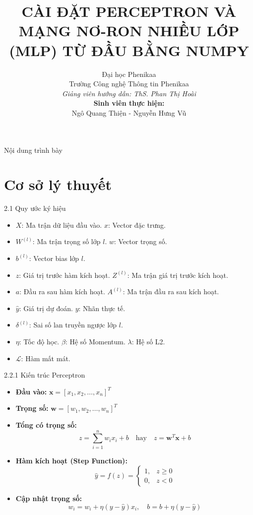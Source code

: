 \documentclass{beamer}
\title[Cài đặt Perceptron \& MLP]{CÀI ĐẶT PERCEPTRON VÀ MẠNG NƠ-RON NHIỀU LỚP (MLP) TỪ ĐẦU BẰNG NUMPY}
\author[Thiện, Vũ]{
  Đại học Phenikaa \\
  Trường Công nghệ Thông tin Phenikaa \\
  \vspace{0.5cm}
  \textit{Giảng viên hướng dẫn: ThS. Phan Thị Hoài} \\
  \vspace{0.2cm}
  \textbf{Sinh viên thực hiện:} \\
  Ngô Quang Thiện - Nguyễn Hưng Vũ
}
\institute[Phenikaa Uni]{}
\date{}
\begin{document}
\begin{frame}
  \titlepage
\end{frame}

\begin{frame}{Nội dung trình bày}
  \tableofcontents
\end{frame}

\section{Cơ sở lý thuyết}

\begin{frame}{2.1 Quy ước ký hiệu}
  \begin{itemize}
    \item $X$: Ma trận dữ liệu đầu vào. $x$: Vector đặc trưng.
    \item $W^{(l)}$: Ma trận trọng số lớp $l$. $w$: Vector trọng số.
    \item $b^{(l)}$: Vector bias lớp $l$.
    \item $z$: Giá trị trước hàm kích hoạt. $Z^{(l)}$: Ma trận giá trị trước kích hoạt.
    \item $a$: Đầu ra sau hàm kích hoạt. $A^{(l)}$: Ma trận đầu ra sau kích hoạt.
    \item $\hat{y}$: Giá trị dự đoán. $y$: Nhãn thực tế.
    \item $\delta^{(l)}$: Sai số lan truyền ngược lớp $l$.
    \item $\eta$: Tốc độ học. $\beta$: Hệ số Momentum. $\lambda$: Hệ số L2.
    \item $\mathcal{L}$: Hàm mất mát.
  \end{itemize}
\end{frame}

\begin{frame}{2.2.1 Kiến trúc Perceptron}
  \begin{itemize}
    \item \textbf{Đầu vào:} $\mathbf{x} = [x_1, x_2, \dots, x_n]^T$
    \item \textbf{Trọng số:} $\mathbf{w} = [w_1, w_2, \dots, w_n]^T$
    \item \textbf{Tổng có trọng số:}
    \begin{equation*}
        z = \sum_{i=1}^n w_i x_i + b \quad \text{hay} \quad z = \mathbf{w}^T \mathbf{x} + b
    \end{equation*}
    \item \textbf{Hàm kích hoạt (Step Function):}
    \begin{equation*}
        \hat{y} = f(z) = \begin{cases} 1, & z \ge 0 \\ 0, & z < 0 \end{cases}
    \end{equation*}
    \item \textbf{Cập nhật trọng số:}
    \begin{equation*}
        w_i = w_i + \eta(y - \hat{y})x_i, \quad b = b + \eta(y - \hat{y})
    \end{equation*}
  \end{itemize}
\end{frame}
\end{document}

